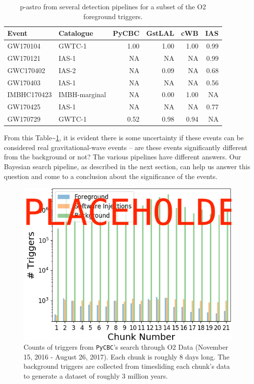 \documentclass[%
 reprint,
 amsmath,amssymb,
 aps,
]{revtex4}
\begin{document}
\begin{table}[t]

\caption[p-astro for various O2 foreground triggers]{\label{tab:O2significancesWObcr}p-astro from several detection pipelines for a subset of the O2 foreground triggers.}
\centering
\begin{tabular}{llrrrr}
\toprule
Event & Catalogue & PyCBC & GstLAL & cWB & IAS\\
\midrule
GW170104 & GWTC-1 & 1.00 & 1.00 & 1.00 & 0.99\\
GW170121 & IAS-1 & NA & NA & NA & 0.99\\
GWC170402 & IAS-2 & NA & 0.09 & NA & 0.68\\
GW170403 & IAS-1 & NA & NA & NA & 0.56\\
IMBHC170423 & IMBH-marginal & NA & 0.00 & 1.00 & NA\\
GW170425 & IAS-1 & NA & NA & NA & 0.77\\
GW170729 & GWTC-1 & 0.52 & 0.98 & 0.94 & NA\\
\end{tabular}
\end{table}

From this Table\textasciitilde\ref{tab:O2significancesWObcr}, it is evident there is some uncertainty if these events can be considered real
gravitational-wave events -- are these events significantly different from the background or not? The various pipelines
have different answers. Our Bayesian search pipeline, as described in the next section, can help us answer this question
and come to a conclusion about the significance of the events.

\begin{figure}[!h]

{\centering \includegraphics[width=0.75\linewidth]{images/O2_unfiltered_trigger_counts} 

}

\caption[Count of all triggers in PyCBC O2 search]{Counts of triggers from \texttt{PyCBC}'s search through O2 Data (November 15, 2016 - August 26, 2017). Each chunk is roughly 8 days long. The background triggers are collected from timesliding each chunk's data to generate a dataset of roughly 3 million years.}\label{fig:o2TrigCount}
\end{figure}
\end{document}
